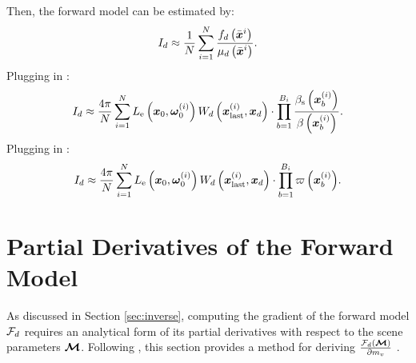 \documentclass{article}
\begin{document}
Then, the forward model can be estimated by:
\begin{equation}
\label{eq:forward_approax_app}
I_{d} \approx \frac{1}{N}\sum_{i=1}^{N}{\frac{f_{d}\left({\Bar{\boldsymbol{x}}^{i}}\right)}{\mu_{d}\left({\Bar{\boldsymbol{x}}^{i}}\right)}}.
\end{equation}
Plugging \eqs{\ref{eq:cont_func_scattering},\ref{eq:final_mu}} in \eq{\ref{eq:forward_approax_app}}:
\begin{equation}
\label{eq:forward_approax2_app}
I_{d} \approx \frac{4\pi}{N}\sum_{i=1}^{N}{
L_{\text{e}}\left({\boldsymbol{x}_0,\boldsymbol{\omega}^{\left({i}\right)}_0}\right)W_{d}\left({\boldsymbol{x}^{\left({i}\right)}_{\text{last}},\boldsymbol{x}_{d}}\right) \cdot  \prod_{b=1}^{B_i}{
\frac{\beta_{\text{s}}\left({\boldsymbol{x}^{\left({i}\right)}_{b}}\right)}{ \beta\left({\boldsymbol{x}^{\left({i}\right)}_{b}}\right)}}}.
\end{equation}
Plugging \eq{\ref{eq:eff_sinscat}} in \eq{\ref{eq:forward_approax2_app}}:
\begin{equation}
I_{d} \approx \frac{4\pi}{N}\sum_{i=1}^{N}{
L_{\text{e}}\left({\boldsymbol{x}_0,\boldsymbol{\omega}^{\left({i}\right)}_0}\right)W_{d}\left({\boldsymbol{x}^{\left({i}\right)}_{\text{last}},\boldsymbol{x}_{d}}\right) \cdot \prod_{b=1}^{B_i}{
\varpi\left({\boldsymbol{x}^{\left({i}\right)}_{b}}\right)}}.
\end{equation}

\section{Partial Derivatives of the Forward Model}
\label{sec:partial_deriv_app}
As discussed in Section \ref{sec:inverse}, computing the gradient of the forward model $\mathcal{F}_{d}$ requires an analytical form of its partial derivatives with respect to the scene parameters $\boldsymbol{\mathcal{M}}$.
Following \citep{gkioulekas2016evaluation}, this section provides a method for deriving $\frac{\mathcal{F}_{d}\left({\boldsymbol{\mathcal{M}}}\right)}{\partial m_{v}}$ .
\end{document}
